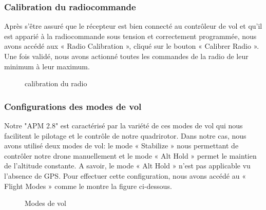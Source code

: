 	

	\subsubsection{Calibration du radiocommande}
	Après s'être assuré que le récepteur est bien connecté au contrôleur de vol et qu'il est apparié à la radiocommande sous tension et correctement programmée, nous avons  accédé aux « Radio Calibration », cliqué sur le bouton « Calibrer Radio ». 
	Une fois validé, nous avons actionné toutes les commandes de la radio de leur minimum à leur maximum. 
	\begin{figure} [H]
		\begin{center}
			\centering
		\end{center}
		\caption{calibration du radio}
	\end{figure}
	
	\subsubsection{Configurations des modes de vol} 
	Notre "APM 2.8" est caractérisé par la variété de ces modes de vol qui nous facilitent le pilotage et le contrôle de notre quadrirotor. Dans notre cas, nous avons utilisé deux modes de vol: le mode « Stabilize » nous permettant de contrôler notre drone manuellement et le mode « Alt Hold » permet le maintien de l'altitude constante. A savoir, le mode « Alt Hold » n'est pas applicable vu l'absence de GPS. Pour effectuer  cette configuration, nous avons accédé au « Flight Modes » comme le montre la figure ci-dessous.
	
	\begin{figure} [H]
		\begin{center}
			\centering
		\end{center}
		\caption{Modes de vol}
	\end{figure}

